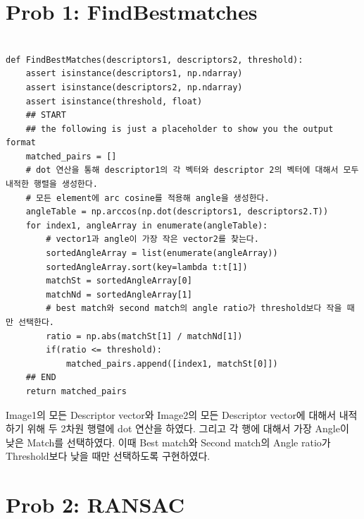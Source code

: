 \documentclass[]{report}
\begin{document}
\section{Prob 1: FindBestmatches}

\begin{lstlisting}

def FindBestMatches(descriptors1, descriptors2, threshold):
    assert isinstance(descriptors1, np.ndarray)
    assert isinstance(descriptors2, np.ndarray)
    assert isinstance(threshold, float)
    ## START
    ## the following is just a placeholder to show you the output format
    matched_pairs = []
    # dot 연산을 통해 descriptor1의 각 벡터와 descriptor 2의 벡터에 대해서 모두 내적한 행렬을 생성한다.
    # 모든 element에 arc cosine를 적용해 angle을 생성한다.
    angleTable = np.arccos(np.dot(descriptors1, descriptors2.T))
    for index1, angleArray in enumerate(angleTable):
        # vector1과 angle이 가장 작은 vector2를 찾는다.
        sortedAngleArray = list(enumerate(angleArray))
        sortedAngleArray.sort(key=lambda t:t[1])
        matchSt = sortedAngleArray[0]
        matchNd = sortedAngleArray[1]
        # best match와 second match의 angle ratio가 threshold보다 작을 때만 선택한다.
        ratio = np.abs(matchSt[1] / matchNd[1])
        if(ratio <= threshold):
            matched_pairs.append([index1, matchSt[0]])
    ## END
    return matched_pairs

\end{lstlisting}

Image1의 모든 Descriptor vector와 Image2의 모든 Descriptor vector에 대해서 내적하기 위해
두 2차원 행렬에 dot 연산을 하였다. 그리고 각 행에 대해서 가장 Angle이 낮은 Match를 선택하였다.
이때 Best match와 Second match의 Angle ratio가 Threshold보다 낮을 때만 선택하도록 구현하였다.\\

\section{Prob 2: RANSAC}
\end{document}
